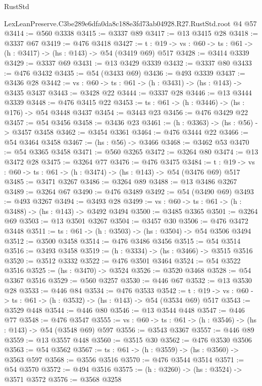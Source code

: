 \begin{lexlean}{RustStd}
\begin{coremodule}
  LexLeanPreserve.C3be289e6dfa0da8c188e3fd73ab04928.R27.RustStd.root @4 @57
@3414 := @560 @3338
@3415 := @3337 @89
@3417 := @13 @3415 @28
@3418 := @3337 @67
@3419 := @476 @3418
@3427 := {t : @19} -> {vs : @60} -> {ts : @61} -> (h : @3417) -> (hs : @143) -> @54 (@3419 @69) @517
@3428 := @3414 @3339
@3429 := @3337 @69
@3431 := @13 @3429 @3339
@3432 := @3337 @80
@3433 := @476 @3432
@3435 := @54 (@3433 @69)
@3436 := @493 @3339
@3437 := @3436 @28
@3442 := {vs : @60} -> {ts : @61} -> (h : @3431) -> (hs : @143) -> @3435 @3437
@3443 := @3428 @22
@3444 := @3337 @28
@3446 := @13 @3444 @3339
@3448 := @476 @3415 @22
@3453 := {ts : @61} -> (h : @3446) -> (hs : @176) -> @54 @3448 @3437
@3454 := @3443 @23
@3456 := @476 @3429 @22
@3457 := @54 @3456
@3458 := @3436 @23
@3461 := (h : @3363) -> (hs : @56) -> @3457 @3458
@3462 := @3454 @3361
@3464 := @476 @3444 @22
@3466 := @54 @3464 @3458
@3467 := (hs : @56) -> @3466
@3468 := @3462 @53
@3470 := @54 @3365 @3458
@3471 := @560 @3265
@3472 := @3264 @80
@3474 := @13 @3472 @28
@3475 := @3264 @77
@3476 := @476 @3475
@3484 := {t : @19} -> {vs : @60} -> {ts : @61} -> (h : @3474) -> (hs : @143) -> @54 (@3476 @69) @517
@3485 := @3471 @3267
@3486 := @3264 @89
@3488 := @13 @3486 @3267
@3489 := @3264 @67
@3490 := @476 @3489
@3492 := @54 (@3490 @69)
@3493 := @493 @3267
@3494 := @3493 @28
@3499 := {vs : @60} -> {ts : @61} -> (h : @3488) -> (hs : @143) -> @3492 @3494
@3500 := @3485 @3365
@3501 := @3264 @69
@3503 := @13 @3501 @3267
@3504 := @3457 @30
@3506 := @476 @3472 @3448
@3511 := {ts : @61} -> (h : @3503) -> (hs : @3504) -> @54 @3506 @3494
@3512 := @3500 @3458
@3514 := @476 @3486 @3456
@3515 := @54 @3514
@3516 := @3493 @3458
@3519 := (h : @3334) -> (hs : @3466) -> @3515 @3516
@3520 := @3512 @3332
@3522 := @476 @3501 @3464
@3524 := @54 @3522 @3516
@3525 := (hs : @3470) -> @3524
@3526 := @3520 @3468
@3528 := @54 @3367 @3516
@3529 := @560 @3257
@3530 := @446 @67
@3532 := @13 @3530 @28
@3533 := @446 @84
@3534 := @476 @3533
@3542 := {t : @19} -> {vs : @60} -> {ts : @61} -> (h : @3532) -> (hs : @143) -> @54 (@3534 @69) @517
@3543 := @3529 @448
@3544 := @446 @80
@3546 := @13 @3544 @448
@3547 := @446 @77
@3548 := @476 @3547
@3555 := {vs : @60} -> {ts : @61} -> (h : @3546) -> (hs : @143) -> @54 (@3548 @69) @597
@3556 := @3543 @3367
@3557 := @446 @89
@3559 := @13 @3557 @448
@3560 := @3515 @30
@3562 := @476 @3530 @3506
@3563 := @54 @3562
@3567 := {ts : @61} -> (h : @3559) -> (hs : @3560) -> @3563 @597
@3568 := @3556 @3516
@3570 := @476 @3544 @3514
@3571 := @54 @3570
@3572 := @494 @3516
@3575 := (h : @3260) -> (hs : @3524) -> @3571 @3572
@3576 := @3568 @3258

\end{coremodule}
\end{lexlean}
